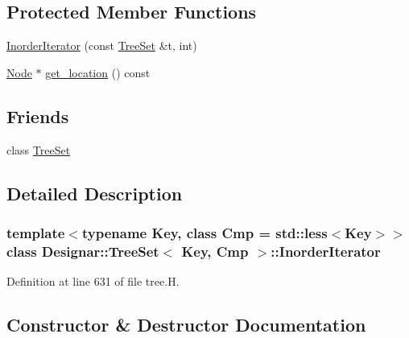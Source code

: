 \subsection*{Protected Member Functions}
\begin{DoxyCompactItemize}
\item 
\hyperlink{class_designar_1_1_tree_set_1_1_inorder_iterator_a71c23649fcff4269dd3096ce6ac10e2d}{Inorder\+Iterator} (const \hyperlink{class_designar_1_1_tree_set}{Tree\+Set} \&t, int)
\item 
\hyperlink{class_designar_1_1_tree_set_a7409a9c1545c0e9e2fd6b84120713c99}{Node} $\ast$ \hyperlink{class_designar_1_1_tree_set_1_1_inorder_iterator_a06e9a4e3d4d834c250932e3d77190b1f}{get\+\_\+location} () const
\end{DoxyCompactItemize}
\subsection*{Friends}
\begin{DoxyCompactItemize}
\item 
class \hyperlink{class_designar_1_1_tree_set_1_1_inorder_iterator_a7caa42294700d2a60905ec3458a7cd8a}{Tree\+Set}
\end{DoxyCompactItemize}


\subsection{Detailed Description}
\subsubsection*{template$<$typename Key, class Cmp = std\+::less$<$\+Key$>$$>$\newline
class Designar\+::\+Tree\+Set$<$ Key, Cmp $>$\+::\+Inorder\+Iterator}



Definition at line 631 of file tree.\+H.



\subsection{Constructor \& Destructor Documentation}
\mbox{\label{class_designar_1_1_tree_set_1_1_inorder_iterator_a71c23649fcff4269dd3096ce6ac10e2d}} 
